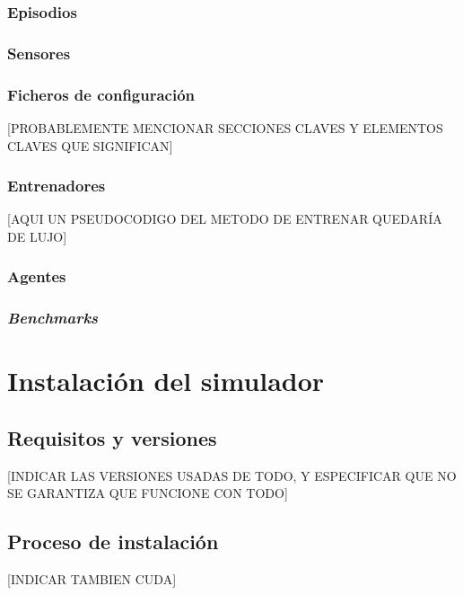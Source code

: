 \subsubsection{Episodios}

\subsubsection{Sensores}

\subsubsection{Ficheros de configuración}
[PROBABLEMENTE MENCIONAR SECCIONES CLAVES Y ELEMENTOS CLAVES QUE SIGNIFICAN]

\subsubsection{Entrenadores}

[AQUI UN PSEUDOCODIGO DEL METODO DE ENTRENAR QUEDARÍA DE LUJO]

\subsubsection{Agentes}

\subsubsection{\textit{Benchmarks}}

\section{Instalación del simulador}

\subsection{Requisitos y versiones}
[INDICAR LAS VERSIONES USADAS DE TODO, Y ESPECIFICAR QUE NO SE GARANTIZA QUE FUNCIONE CON TODO]

\subsection{Proceso de instalación}
[INDICAR TAMBIEN CUDA]